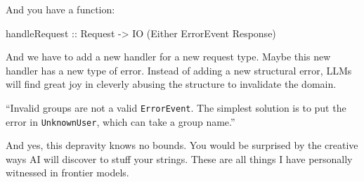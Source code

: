 \documentclass[]{article}
\newenvironment{Shaded}{}{}
\newcommand{\CommentTok}[1]{\textcolor[rgb]{0.38,0.63,0.69}{\textit{#1}}}
\newcommand{\DataTypeTok}[1]{\textcolor[rgb]{0.56,0.13,0.00}{#1}}
\newcommand{\FunctionTok}[1]{\textcolor[rgb]{0.02,0.16,0.49}{#1}}
\newcommand{\KeywordTok}[1]{\textcolor[rgb]{0.00,0.44,0.13}{\textbf{#1}}}
\newcommand{\NormalTok}[1]{#1}
\newcommand{\OperatorTok}[1]{\textcolor[rgb]{0.40,0.40,0.40}{#1}}
\newcommand{\OtherTok}[1]{\textcolor[rgb]{0.00,0.44,0.13}{#1}}
\newcommand{\StringTok}[1]{\textcolor[rgb]{0.25,0.44,0.63}{#1}}
\begin{document}
And you have a function:

\begin{Shaded}
\begin{Highlighting}[]
\OtherTok{handleRequest ::} \DataTypeTok{Request} \OtherTok{{-}\textgreater{}} \DataTypeTok{IO}\NormalTok{ (}\DataTypeTok{Either} \DataTypeTok{ErrorEvent} \DataTypeTok{Response}\NormalTok{)}
\end{Highlighting}
\end{Shaded}

And we have to add a new handler for a new request type. Maybe this new handler
has a new type of error. Instead of adding a new structural error, LLMs will
find great joy in cleverly abusing the structure to invalidate the domain.

\begin{Shaded}
\end{Shaded}

{``Invalid groups are not a valid \texttt{ErrorEvent}. The simplest solution is
to put the error in \texttt{UnknownUser}, which can take a group name.''}

And yes, this depravity knows no bounds. You would be surprised by the creative
ways AI will discover to stuff your strings. These are all things I have
personally witnessed in frontier models.
\end{document}
